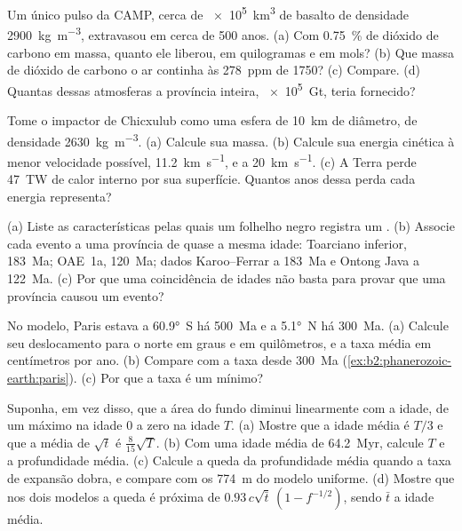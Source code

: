 \begin{exercise}[$\star\star$]\label{exo:b2:phanerozoic-earth:6}
Um único pulso da CAMP, cerca de \qty{e5}{km^3} de basalto de densidade \qty{2900}{kg.m^{-3}},
extravasou em cerca de 500 anos. (a) Com \qty{0.75}{\percent} de dióxido de carbono em massa, quanto
ele liberou, em quilogramas e em mols? (b) Que massa de dióxido de carbono o ar continha
às \qty{278}{ppm} de 1750? (c) Compare. (d) Quantas dessas atmosferas a província inteira,
\qty{e5}{Gt}, teria fornecido?
\end{exercise}

\begin{exercise}[$\star\star$]\label{exo:b2:phanerozoic-earth:7}
Tome o impactor de Chicxulub como uma esfera de \qty{10}{km} de diâmetro, de densidade
\qty{2630}{kg.m^{-3}}. (a) Calcule sua massa. (b) Calcule sua energia cinética à menor velocidade
possível, \qty{11.2}{km.s^{-1}}, e a \qty{20}{km.s^{-1}}. (c) A Terra perde \qty{47}{TW} de
calor interno por sua superfície. Quantos anos dessa perda cada energia representa?
\end{exercise}

\begin{exercise}[$\star\star$]\label{exo:b2:phanerozoic-earth:8}
(a) Liste as características pelas quais um folhelho negro registra um . (b) Associe cada
evento a uma província de quase a mesma idade: Toarciano inferior, \qty{183}{Ma}; OAE~1a,
\qty{120}{Ma}; dados Karoo--Ferrar a \qty{183}{Ma} e Ontong Java a \qty{122}{Ma}. (c) Por que uma
coincidência de idades não basta para provar que uma província causou um evento?
\end{exercise}

\begin{exercise}[$\star\star$]\label{exo:b2:phanerozoic-earth:9}
No modelo, Paris estava a \ang{60.9}~S há \qty{500}{Ma} e a \ang{5.1}~N há \qty{300}{Ma}.
(a) Calcule seu deslocamento para o norte em graus e em quilômetros, e a taxa média em
centímetros por ano. (b) Compare com a taxa desde \qty{300}{Ma}
(\cref{ex:b2:phanerozoic-earth:paris}). (c) Por que a taxa é um mínimo?
\end{exercise}

\begin{exercise}[$\star\star\star$]\label{exo:b2:phanerozoic-earth:10}
Suponha, em vez disso, que a área do fundo diminui linearmente com a idade, de um máximo na idade 0 a zero
na idade $T$. (a) Mostre que a idade média é $T/3$ e que a média de $\sqrt t$ é
$\tfrac{8}{15}\sqrt T$. (b) Com uma idade média de \qty{64.2}{Myr}, calcule $T$ e a profundidade média. (c)
Calcule a queda da profundidade média quando a taxa de expansão dobra, e compare com os
\qty{774}{m} do modelo uniforme. (d) Mostre que nos dois modelos a queda é próxima de $0.93\,c\sqrt{\bar
t}\,(1 - f^{-1/2})$, sendo $\bar t$ a idade média.
\end{exercise}

